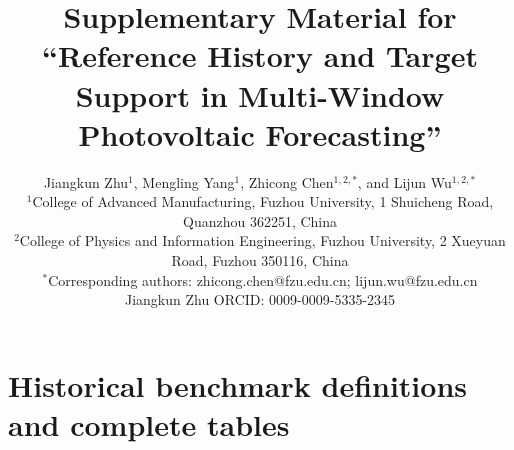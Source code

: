\documentclass[11pt]{article}
\begin{document}
\renewcommand{\thetable}{S\arabic{table}}
\renewcommand{\thefigure}{S\arabic{figure}}
\renewcommand{\theequation}{S\arabic{equation}}
\title{Supplementary Material for ``Reference History and Target Support in Multi-Window Photovoltaic Forecasting''}
\author{Jiangkun Zhu$^{1}$, Mengling Yang$^{1}$, Zhicong Chen$^{1,2,*}$, and Lijun Wu$^{1,2,*}$\\[0.5em]
\small $^{1}$College of Advanced Manufacturing, Fuzhou University, 1 Shuicheng Road, Quanzhou 362251, China\\
\small $^{2}$College of Physics and Information Engineering, Fuzhou University, 2 Xueyuan Road, Fuzhou 350116, China\\
\small $^{*}$Corresponding authors: zhicong.chen@fzu.edu.cn; lijun.wu@fzu.edu.cn\\
\small Jiangkun Zhu ORCID: 0009-0009-5335-2345}
\date{}
\maketitle




\clearpage\part*{Historical benchmark definitions and complete tables}

\end{document}

